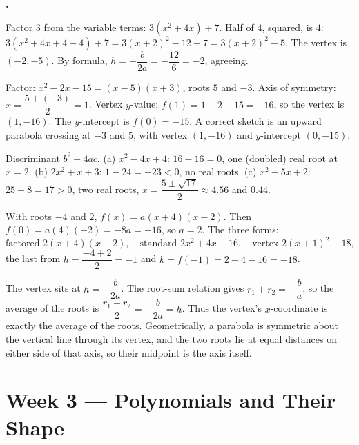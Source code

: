 \documentclass[12pt]{book}
\newcounter{soln}[section]
\newenvironment{solutions}{%
  \setcounter{soln}{0}%
  \begin{list}{\textbf{\arabic{soln}.}}{%
    \usecounter{soln}\setlength{\leftmargin}{2.2em}\setlength{\itemsep}{10pt}}%
}{\end{list}}
\begin{document}
\begin{solutions}
\item Factor $3$ from the variable terms: $3(x^2+4x)+7$. Half of $4$, squared, is $4$:
$3(x^2+4x+4-4)+7=3(x+2)^2-12+7=3(x+2)^2-5$. The vertex is $(-2,-5)$. By formula,
$h=-\dfrac{b}{2a}=-\dfrac{12}{6}=-2$, agreeing.

\item Factor: $x^2-2x-15=(x-5)(x+3)$, roots $5$ and $-3$. Axis of symmetry:
$x=\dfrac{5+(-3)}{2}=1$. Vertex $y$-value: $f(1)=1-2-15=-16$, so the vertex is
$(1,-16)$. The $y$-intercept is $f(0)=-15$. A correct sketch is an upward parabola
crossing at $-3$ and $5$, with vertex $(1,-16)$ and $y$-intercept $(0,-15)$.

\item Discriminant $b^2-4ac$. (a) $x^2-4x+4$: $16-16=0$, one (doubled) real root at
$x=2$. (b) $2x^2+x+3$: $1-24=-23<0$, no real roots. (c) $x^2-5x+2$: $25-8=17>0$, two
real roots, $x=\dfrac{5\pm\sqrt{17}}{2}\approx 4.56$ and $0.44$.

\item With roots $-4$ and $2$, $f(x)=a(x+4)(x-2)$. Then $f(0)=a(4)(-2)=-8a=-16$, so
$a=2$. The three forms:
\[
\text{factored } 2(x+4)(x-2),\quad
\text{standard } 2x^2+4x-16,\quad
\text{vertex } 2(x+1)^2-18,
\]
the last from $h=\dfrac{-4+2}{2}=-1$ and $k=f(-1)=2-4-16=-18$.

\item The vertex sits at $h=-\dfrac{b}{2a}$. The root-sum relation gives
$r_1+r_2=-\dfrac{b}{a}$, so the average of the roots is
$\dfrac{r_1+r_2}{2}=-\dfrac{b}{2a}=h$. Thus the vertex's $x$-coordinate is exactly the
average of the roots. Geometrically, a parabola is symmetric about the vertical line
through its vertex, and the two roots lie at equal distances on either side of that
axis, so their midpoint is the axis itself.
\end{solutions}

\section*{Week 3 — Polynomials and Their Shape}
\setcounter{section}{3}
\end{document}

